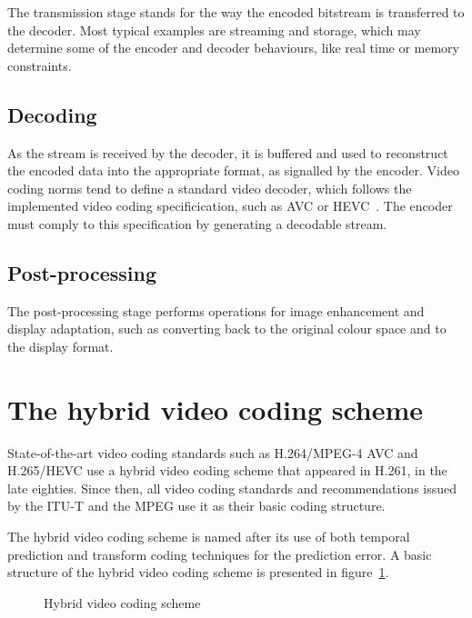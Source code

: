 \documentclass[11pt,a4paper,openright,twoside]{book}
\numberwithin{equation}{section} %
\begin{document}
The transmission stage stands for the way the encoded bitstream is
transferred to the decoder.
Most typical examples are streaming and storage, which may determine
some of the encoder and decoder behaviours, like real time or memory
constraints.

\subsection{Decoding}
\label{sub:decoding}

As the stream is received by the decoder, it is buffered and used to
reconstruct the encoded data into the appropriate format, as signalled
by the encoder.
Video coding norms tend to define a standard video decoder, which
follows the implemented video coding specificication, such as \ac{AVC}
or \ac{HEVC}~\cite{itu-14-h265-hevc-rec,sullivan-12-overview-hevc}.
The encoder must comply to this specification by generating a decodable
stream.

\subsection{Post-processing}
\label{sub:post_processing}

The post-processing stage performs operations for image enhancement and
display adaptation, such as converting back to the original colour
space and to the display format.

\section{The hybrid video coding scheme}
\label{sec:the_hybrid_video_coding_scheme}

State-of-the-art video coding standards such as H.264/\acs{MPEG}-4 \acs{AVC}
and H.265/\acs{HEVC} use a hybrid video coding scheme that appeared in
H.261, in the late eighties.
Since then, all video coding standards and recommendations issued by the
\ac{ITU-T} and the \ac{MPEG} use it as their basic coding structure.

The hybrid video coding scheme is named after its use of both temporal
prediction and transform coding techniques for the prediction error.
A basic structure of the hybrid video coding scheme is presented in
figure~\ref{fig:hybrid_video_coding_scheme}.

\begin{figure}[ht]
	\centering
	
	\caption{Hybrid video coding scheme}
	\label{fig:hybrid_video_coding_scheme}
\end{figure}
\end{document}
